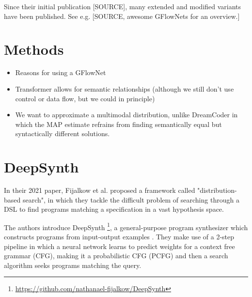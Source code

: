 Since their initial publication [SOURCE], many extended and modified variants have been published. See e.g. [SOURCE, awesome GFlowNets for an overview.]

\section{Methods}

\begin{itemize}
    \item Reasons for using a GFlowNet
    \item Transformer allows for semantic relationships (although we still don't use control or data flow, but we could in principle)
    \item We want to approximate a multimodal distribution, unlike DreamCoder in which the MAP estimate refrains from finding semantically equal but syntactically different solutions.
\end{itemize}





























\section{DeepSynth}




In their 2021 paper, Fijalkow et al. proposed a framework called "distribution-based search", in which they tackle the difficult problem of searching through a DSL to find programs matching a specification in a vast hypothesis space. 

The authors introduce DeepSynth \footnote{\url{https://github.com/nathanael-fijalkow/DeepSynth}}, a general-purpose program synthesizer which constructs programs from input-output examples \cite{fijalkow_scaling_2021}. They make use of a 2-step pipeline in which a neural network learns to predict weights for a context free grammar (CFG), making it a probabilistic CFG (PCFG) and then a search algorithm seeks programs matching the query.

